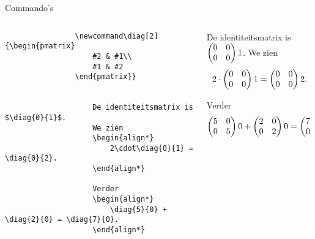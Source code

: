 \begin{frame}[fragile]{Commando's}
    \begin{columns}
        \begin{column}{0.5\textwidth}
            \begin{verbatim}
                \newcommand\diag[2]{\begin{pmatrix}
                    #2 & #1\\
                    #1 & #2
                \end{pmatrix}}
        
                
                    De identiteitsmatrix is $\diag{0}{1}$.
                    We zien
                    \begin{align*}
                        2\cdot\diag{0}{1} = \diag{0}{2}.
                    \end{align*}

                    Verder
                    \begin{align*}
                        \diag{5}{0} + \diag{2}{0} = \diag{7}{0}.
                    \end{align*}
                
            \end{verbatim}
        \end{column}
        \begin{column}{0.5\textwidth}
            \begin{demobox}\small\setlength\parskip{5pt}    
                De identiteitsmatrix is $\diag{0}{1}$.
                We zien
                \begin{align*}
                    2\cdot\diag{0}{1} = \diag{0}{2}.
                \end{align*}

                Verder
                \begin{align*}
                    \diag{5}{0} + \diag{2}{0} = \diag{7}{0}.
                \end{align*}
            \end{demobox}
        \end{column}
    \end{columns}
\end{frame}

\let\diag\somethingundefined
\newcommand\diag[2][0]{\begin{pmatrix}
    #2 & #1\\
    #1 & #2
\end{pmatrix}}

